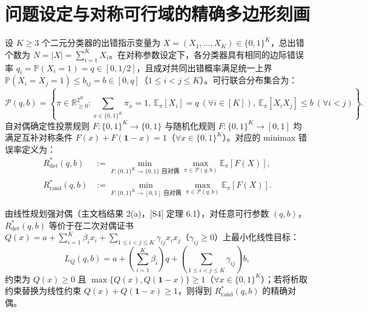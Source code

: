 \documentclass[11pt,a4paper]{article}
\theoremstyle{definition}
\theoremstyle{remark}
\newcommand{\Rdet}{R^*_{\mathrm{det}}}
\newcommand{\Rrand}{R^*_{\mathrm{rand}}}
\begin{document}
\section{问题设定与对称可行域的精确多边形刻画}

设 $K \ge 3$ 个二元分类器的出错指示变量为 $X = (X_1, \dots, X_K) \in \{0, 1\}^K$，总出错个数为 $N = |X| = \sum_{i=1}^K X_i$。在对称参数设定下，各分类器具有相同的边际错误率 $q_i = \mathbb{P}(X_i = 1) = q \in [0, 1/2]$，且成对共同出错概率满足统一上界 $\mathbb{P}(X_i = X_j = 1) \le b_{ij} = b \in [0, q]$（$1 \le i < j \le K$）。可行联合分布集合为：
\begin{equation}\label{eq:P_sym}
  \mathcal{P}(q, b) = \left\{ \pi \in \mathbb{R}_{\ge 0}^{2^K} : \sum_{x \in \{0,1\}^K} \pi_x = 1,\ \mathbb{E}_\pi[X_i] = q\ (\forall i \in [K]),\ \mathbb{E}_\pi[X_i X_j] \le b\ (\forall i < j) \right\}.
\end{equation}
自对偶确定性投票规则 $F: \{0,1\}^K \to \{0,1\}$ 与随机化规则 $F: \{0,1\}^K \to [0,1]$ 均满足互补对称条件 $F(x) + F(\mathbf{1}-x) = 1$（$\forall x \in \{0,1\}^K$）。对应的 minimax 错误率定义为：
\begin{equation}\label{eq:minimax_def}
  \begin{aligned}
    \Rdet(q, b) &:= \min_{F:\{0,1\}^K \to \{0,1\}\text{ 自对偶}} \max_{\pi \in \mathcal{P}(q,b)} \mathbb{E}_\pi[F(X)], \\
    \Rrand(q, b) &:= \min_{F:\{0,1\}^K \to [0,1]\text{ 自对偶}} \max_{\pi \in \mathcal{P}(q,b)} \mathbb{E}_\pi[F(X)].
  \end{aligned}
\end{equation}

由线性规划强对偶（主文档结果 2(a)，[S4] 定理 6.1），对任意可行参数 $(q, b)$，$\Rdet(q, b)$ 等价于在二次对偶证书 $Q(x) = a + \sum_{i=1}^K \beta_i x_i + \sum_{1 \le i < j \le K} \gamma_{ij} x_i x_j$（$\gamma_{ij} \ge 0$）上最小化线性目标：
\begin{equation}\label{eq:dual_obj}
  L_Q(q, b) = a + \left(\sum_{i=1}^K \beta_i\right) q + \left(\sum_{1 \le i < j \le K} \gamma_{ij}\right) b,
\end{equation}
约束为 $Q(x) \ge 0$ 且 $\max\{Q(x), Q(\mathbf{1}-x)\} \ge 1$（$\forall x \in \{0,1\}^K$）；若将析取约束替换为线性约束 $Q(x) + Q(\mathbf{1}-x) \ge 1$，则得到 $\Rrand(q, b)$ 的精确对偶。
\end{document}
